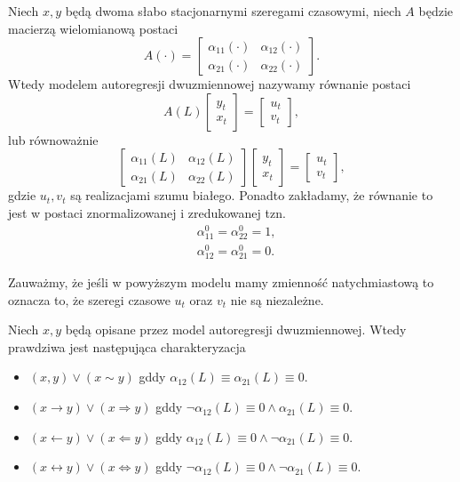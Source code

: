 \documentclass[10pt,a4paper]{book}
\begin{document}
\begin{definition}
Niech $x,y$ będą dwoma słabo stacjonarnymi szeregami czasowymi, niech $A$ będzie macierzą wielomianową postaci
$$
A(\cdot) = \begin{bmatrix}
\alpha_{11} (\cdot) & \alpha_{12} (\cdot)\\
\alpha_{21} (\cdot) & \alpha_{22} (\cdot)
\end{bmatrix}.
$$
Wtedy modelem autoregresji dwuzmiennowej nazywamy równanie postaci
$$
A(L) \begin{bmatrix}
y_t\\ x_t
\end{bmatrix} = \begin{bmatrix}
u_t \\ v_t
\end{bmatrix},
$$
lub równoważnie
$$
\begin{bmatrix}
\alpha_{11} (L) & \alpha_{12} (L)\\
\alpha_{21} (L) & \alpha_{22} (L)
\end{bmatrix} \begin{bmatrix}
y_t\\ x_t
\end{bmatrix} = \begin{bmatrix}
u_t \\ v_t
\end{bmatrix},
$$
gdzie $u_t, v_t$ są realizacjami szumu białego. Ponadto zakładamy, że równanie to jest w postaci znormalizowanej i zredukowanej tzn.
\begin{align*}
& \alpha_{11}^0 = \alpha_{22}^0 = 1,\\
& \alpha_{12}^0 = \alpha_{21}^0 = 0.
\end{align*}
\end{definition}

\begin{remark}
Zauważmy, że jeśli w powyższym modelu mamy zmienność natychmiastową to oznacza to, że szeregi czasowe $u_t$ oraz $v_t$ nie są niezależne. 
\end{remark}

\begin{theorem}
Niech $x,y$ będą opisane przez model autoregresji dwuzmiennowej. Wtedy prawdziwa jest następująca charakteryzacja
\begin{itemize}
\item $ (x,y) \lor (x \sim y)$ gddy $\alpha_{12}(L) \equiv \alpha_{21}(L) \equiv 0$.
\item $ (x \rightarrow y) \lor (x \Rightarrow y)$ gddy $ \lnot \alpha_{12}(L) \equiv 0 \land \alpha_{21}(L) \equiv 0$. 
\item $ (x \leftarrow y) \lor (x \Leftarrow y)$ gddy $  \alpha_{12}(L) \equiv 0 \land \lnot \alpha_{21}(L) \equiv 0$.
\item $ (x \leftrightarrow y) \lor (x \Leftrightarrow y)$ gddy $ \lnot \alpha_{12}(L) \equiv 0 \land \lnot \alpha_{21}(L) \equiv 0$.
\end{itemize}
\end{theorem}
\end{document}
